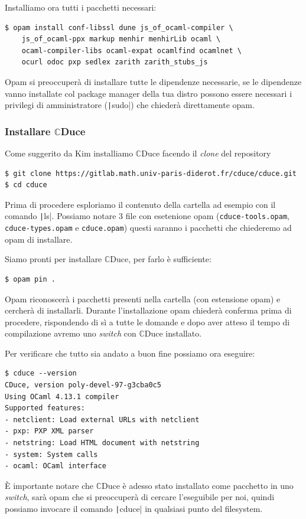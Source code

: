 \documentclass[]{article}
\newcommand{\cduce}{$\mathbb {C}$Duce\xspace}
\begin{document}
Installiamo ora tutti i pacchetti necessari:
\begin{verbatim}
$ opam install conf-libssl dune js_of_ocaml-compiler \
	js_of_ocaml-ppx markup menhir menhirLib ocaml \
	ocaml-compiler-libs ocaml-expat ocamlfind ocamlnet \
	ocurl odoc pxp sedlex zarith zarith_stubs_js
\end{verbatim}
Opam si preoccuperà di installare tutte le dipendenze necessarie, se le dipendenze vanno installate col package manager della tua distro possono essere necessari i privilegi di amministratore (\texttt|sudo|) che chiederà direttamente opam.

\subsubsection*{Installare \cduce}
Come suggerito da Kim installiamo \cduce facendo il \textit{clone} del repository 
\begin{verbatim}
$ git clone https://gitlab.math.univ-paris-diderot.fr/cduce/cduce.git
$ cd cduce
\end{verbatim}
Prima di procedere esploriamo il contenuto della cartella ad esempio con il comando  \texttt|ls|. Possiamo notare 3 file con esetenione opam (\texttt{cduce-tools.opam}, \texttt{cduce-types.opam} e \texttt{cduce.opam}) questi saranno i pacchetti che chiederemo ad opam di installare.

Siamo pronti per installare \cduce, per farlo è sufficiente:
\begin{verbatim}
$ opam pin .
\end{verbatim}
Opam riconoscerà i pacchetti presenti nella cartella (con estensione opam) e cercherà di installarli. Durante l'installazione opam chiederà conferma prima di procedere, rispondendo di sì a tutte le domande e dopo aver atteso il tempo di compilazione avremo uno \textit{switch} con \cduce installato.

Per verificare che tutto sia andato a buon fine possiamo ora eseguire:
\begin{verbatim}
$ cduce --version
CDuce, version poly-devel-97-g3cba0c5
Using OCaml 4.13.1 compiler
Supported features: 
- netclient: Load external URLs with netclient
- pxp: PXP XML parser
- netstring: Load HTML document with netstring
- system: System calls
- ocaml: OCaml interface
\end{verbatim}

È importante notare che \cduce è adesso stato installato come pacchetto in uno \textit{switch}, sarà opam che si preoccuperà di cercare l'eseguibile per noi, quindi possiamo invocare il comando   \texttt|cduce| in qualsiasi punto del filesystem.
\end{document}
